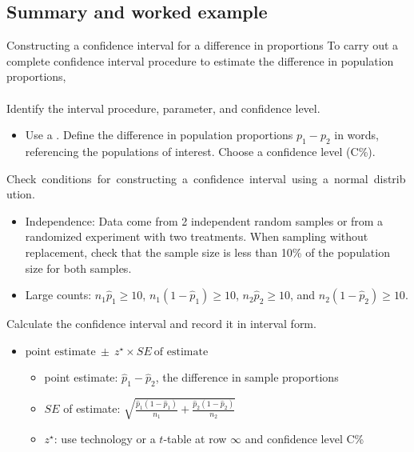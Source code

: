 \subsection[Summary and worked example]{Summary and worked example} 

\begin{onebox}{Constructing a confidence interval for a difference in proportions}
To carry out a complete confidence interval procedure to estimate the difference in population proportions,
\\
\\
    Identify the interval procedure, parameter, and confidence level.\vspace{-1mm}
\begin{itemize}
\item[] Use a .  Define the difference in population proportions $p_1 - p_2$ in words, referencing the populations of interest.  Choose a confidence level (C\%).  
\end{itemize}
  \mbox{Check conditions for constructing a confidence interval using a normal distribution.}\vspace{-1mm}
{\setlength{\leftmargini}{13mm}
\begin{itemize}
\setlength{\itemsep}{0mm}
\item[1.] Independence:  Data come from 2 independent random samples or from a randomized experiment with two treatments.  When sampling without replacement, check that the 
sample size is less than 10\% of the population size for both samples.
\item[2.] Large counts:  $n_1\hat{p}_1\geq10$, $n_1(1-\hat{p}_1)\geq10$,  $n_2\hat{p}_2\geq10$, and $n_2(1-\hat{p}_2)\geq10$.
\end{itemize}
}
   Calculate the confidence interval and record it in interval form.
\begin{itemize}
\item[] $\text{point estimate}\ \pm\ z^{\star} \times SE\ \text{of estimate}$
\begin{itemize}
\item[] point estimate:  $\hat{p}_1 - \hat{p}_2$, the difference in sample proportions 
\item[] $SE$ of estimate:  $\sqrt{\frac{\hat{p}_1(1-\hat{p}_1)}{n_1} + \frac{\hat{p}_2(1-\hat{p}_2)}{n_2}}$
\item[] $z^{\star}$: use technology or a $t$-table at row $\infty$ and confidence level C\%

\end{itemize}
\end{itemize}
\end{onebox}
